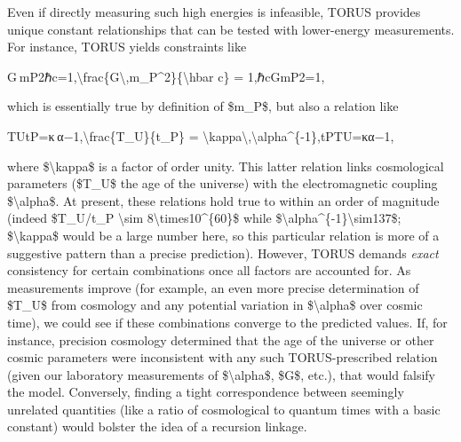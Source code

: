 \documentclass[]{article}
\begin{document}
Even if directly measuring such high energies is infeasible, TORUS
provides unique constant relationships that can be tested with
lower-energy measurements. For instance, TORUS yields constraints like

G mP2ℏc=1,\textbackslash{}frac\{G\textbackslash{},m\_P\^{}2\}\{\textbackslash{}hbar
c\} = 1,ℏcGmP2​​=1,

which is essentially true by definition of \$m\_P\$, but also a relation
like

TUtP=κ α−1,\textbackslash{}frac\{T\_U\}\{t\_P\} =
\textbackslash{}kappa\textbackslash{},\textbackslash{}alpha\^{}\{-1\},tP​TU​​=κα−1,

where \$\textbackslash{}kappa\$ is a factor of order unity. This latter
relation links cosmological parameters (\$T\_U\$ the age of the
universe) with the electromagnetic coupling \$\textbackslash{}alpha\$.
At present, these relations hold true to within an order of magnitude
(indeed \$T\_U/t\_P \textbackslash{}sim
8\textbackslash{}times10\^{}\{60\}\$ while
\$\textbackslash{}alpha\^{}\{-1\}\textbackslash{}sim137\$;
\$\textbackslash{}kappa\$ would be a large number here, so this
particular relation is more of a suggestive pattern than a precise
prediction). However, TORUS demands \emph{exact} consistency for certain
combinations once all factors are accounted for. As measurements improve
(for example, an even more precise determination of \$T\_U\$ from
cosmology and any potential variation in \$\textbackslash{}alpha\$ over
cosmic time), we could see if these combinations converge to the
predicted values. If, for instance, precision cosmology determined that
the age of the universe or other cosmic parameters were inconsistent
with any such TORUS-prescribed relation (given our laboratory
measurements of \$\textbackslash{}alpha\$, \$G\$, etc.), that would
falsify the model. Conversely, finding a tight correspondence between
seemingly unrelated quantities (like a ratio of cosmological to quantum
times with a basic constant) would bolster the idea of a recursion
linkage.
\end{document}

